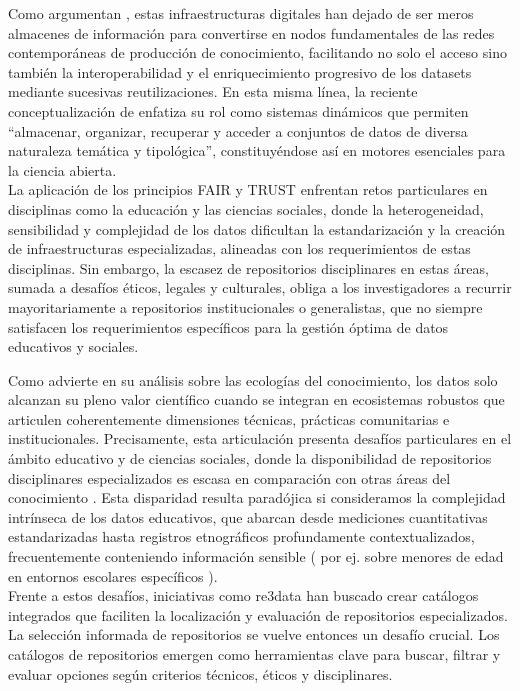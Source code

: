 \documentclass[runningheads]{llncs}
\begin{document}
Como argumentan \citep{borgman2018}, estas infraestructuras digitales han dejado de ser meros almacenes de información para convertirse en nodos fundamentales de las redes contemporáneas de producción de conocimiento, facilitando no solo el acceso sino también la interoperabilidad y el enriquecimiento progresivo de los datasets mediante sucesivas reutilizaciones. En esta misma línea, la reciente conceptualización de \citep[p.~27]{avila2024} enfatiza su rol como sistemas dinámicos que permiten ``almacenar, organizar, recuperar y acceder a conjuntos de datos de diversa naturaleza temática y tipológica'', constituyéndose así en motores esenciales para la ciencia abierta. \\

La aplicación de los principios FAIR \cite{wilkinson2016} y TRUST \cite{Lin2020TRUST}  enfrentan retos particulares en disciplinas como la educación y las ciencias sociales, donde la heterogeneidad, sensibilidad y complejidad de los datos dificultan la estandarización y la creación de infraestructuras especializadas, alineadas con los requerimientos de estas disciplinas. Sin embargo, la escasez de repositorios disciplinares en estas áreas, sumada a desafíos éticos, legales y culturales, obliga a los investigadores a recurrir mayoritariamente a repositorios institucionales o generalistas, que no siempre satisfacen los requerimientos específicos para la gestión óptima de datos educativos y sociales.

Como advierte \citep{borgman2016} en su análisis sobre las ecologías del conocimiento, los datos solo alcanzan su pleno valor científico cuando se integran en ecosistemas robustos que articulen coherentemente dimensiones técnicas, prácticas comunitarias e institucionales. Precisamente, esta articulación presenta desafíos particulares en el ámbito educativo y de ciencias sociales, donde la disponibilidad de repositorios disciplinares especializados es escasa en comparación con otras áreas del conocimiento \cite{kraehmer2023,Lamb2024}. Esta disparidad resulta paradójica si consideramos la complejidad intrínseca de los datos educativos, que abarcan desde mediciones cuantitativas estandarizadas hasta registros etnográficos profundamente contextualizados, frecuentemente conteniendo información sensible ( por ej. sobre menores de edad en entornos escolares específicos \cite{gomes2022}).\\
 
Frente a estos desafíos, iniciativas como re3data \cite{pampel2013} han buscado crear catálogos integrados que faciliten la localización y evaluación de repositorios especializados. La selección informada de repositorios se vuelve entonces un desafío crucial. Los catálogos de repositorios 
emergen como herramientas clave para buscar, filtrar y evaluar opciones según criterios técnicos, éticos y disciplinares. 
\end{document}
